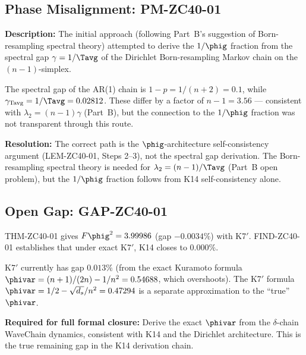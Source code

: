 \documentclass[12pt, a4paper]{article}
\begin{document}
\subsection{Phase Misalignment: PM-ZC40-01}
\label{sec:pm}

\begin{openqbox}[title={PM-ZC40-01: Initial Born-Resampling Spectral Gap Approach}]
\textbf{Description:}
The initial approach (following Part~B's suggestion of Born-resampling
spectral theory) attempted to derive the $1/\phig$ fraction from the
spectral gap $\gamma = 1/\Tavg$ of the Dirichlet Born-resampling
Markov chain on the $(n-1)$-simplex.

The spectral gap of the AR(1) chain is $1-p = 1/(n+2) = 0.1$,
while $\gamma_{\rm Tavg} = 1/\Tavg = 0.02812$.
These differ by a factor of $n-1 = 3.56$ --- consistent with
$\lambda_2 = (n-1)\gamma$ (Part~B), but the connection to the
$1/\phig$ fraction was not transparent through this route.

\textbf{Resolution:}
The correct path is the $\phig$-architecture self-consistency argument
(LEM-ZC40-01, Steps 2--3), not the spectral gap derivation.
The Born-resampling spectral theory is needed for $\lambda_2 = (n-1)/\Tavg$
(Part~B open problem), but the $1/\phig$ fraction follows from K14
self-consistency alone.
\end{openqbox}

\subsection{Open Gap: GAP-ZC40-01}
\label{sec:gap}

\begin{openqbox}[title={GAP-ZC40-01: Exact K7$'$ to Close K14 to $0.000\%$}]
THM-ZC40-01 gives $F\phig^2 = 3.99986$ (gap $-0.0034\%$) with K7$'$.
FIND-ZC40-01 establishes that under exact K7$'$, K14 closes to $0.000\%$.

K7$'$ currently has gap $0.013\%$ (from the exact Kuramoto formula
$\phivar = (n+1)/(2n) - 1/n^2 = 0.54688$, which overshoots).
The K7$'$ formula $\phivar = 1/2 - \sqrt{d_s}/n^2 = 0.47294$ is a
separate approximation to the ``true'' $\phivar$.

\textbf{Required for full formal closure:}
Derive the exact $\phivar$ from the $\delta$-chain WaveChain dynamics,
consistent with K14 and the Dirichlet architecture.
This is the true remaining gap in the K14 derivation chain.
\end{openqbox}
\end{document}
